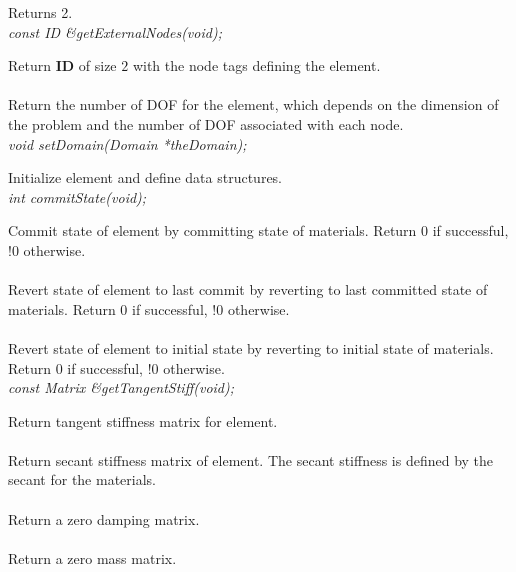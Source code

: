 Returns 2.
\\

{\em    const ID \&getExternalNodes(void);} 

Return {\bf ID} of size $2$ with the node tags defining the element.
\\

 \\	
Return the number of DOF for the element, which depends on the dimension of the problem
and the number of DOF associated with each node.
\\

{\em    void setDomain(Domain *theDomain);} 

Initialize element and define data structures.
\\

{\em    int commitState(void);} 

Commit state of element by committing state of materials.
Return 0 if successful, !0 otherwise.
\\

 \\        
Revert state of element to last commit by reverting to last committed state of materials.
Return 0 if successful, !0 otherwise.
\\

 \\        
Revert state of element to initial state by reverting to initial state of materials.
Return 0 if successful, !0 otherwise.
\\

{\em    const Matrix \&getTangentStiff(void);} 

Return tangent stiffness matrix for element.
\\

 \\    
Return secant stiffness matrix of element.  The secant stiffness is
defined by the secant for the materials.
\\

 \\    
Return a zero damping matrix.
\\

 \\    
Return a zero mass matrix.
\\

